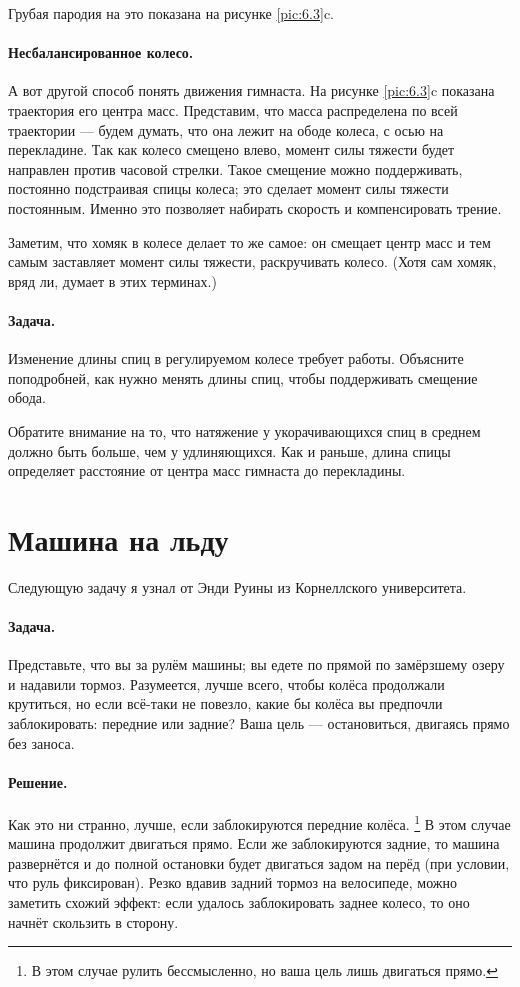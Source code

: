 Грубая пародия на это показана на рисунке \ref{pic:6.3}c.

\paragraph{Несбалансированное колесо.}
А вот другой способ понять движения гимнаста.
На рисунке \ref{pic:6.3}c показана траектория его центра масс.
Представим, что масса распределена по всей траектории --- будем думать, что она лежит на ободе колеса, с осью на перекладине.
Так как колесо смещено влево, момент силы тяжести будет направлен против часовой стрелки.
Такое смещение можно поддерживать, постоянно подстраивая спицы колеса;
это сделает момент силы тяжести постоянным.
Именно это позволяет набирать скорость и компенсировать трение.

Заметим, что хомяк в колесе делает то же самое:
он смещает центр масс и тем самым заставляет момент силы тяжести, раскручивать колесо.
(Хотя сам хомяк, вряд ли, думает в этих терминах.)

\paragraph{Задача.}
Изменение длины спиц в регулируемом колесе требует работы.
Объясните поподробней, как нужно менять длины спиц, чтобы поддерживать смещение обода.

Обратите внимание на то, что натяжение у укорачивающихся спиц в среднем должно быть больше, чем у удлиняющихся.
Как и раньше, длина спицы определяет расстояние от центра масс гимнаста до перекладины.

\section{Машина на льду}

Следующую задачу я узнал от Энди Руины %
из Корнеллского университета.

\paragraph{Задача.}
Представьте, что вы за рулём машины;
вы едете по прямой по замёрзшему озеру и надавили тормоз.
Разумеется, лучше всего, чтобы колёса продолжали крутиться,
но если всё-таки не повезло, какие бы колёса вы предпочли заблокировать: передние или задние?
Ваша цель — остановиться, двигаясь прямо без заноса.

\paragraph{Решение.}
Как это ни странно, лучше, если заблокируются передние колёса.%
\footnote{В этом случае рулить бессмысленно, но ваша цель лишь двигаться прямо.}
В этом случае машина продолжит двигаться прямо.
Если же заблокируются задние, то машина развернётся и до полной остановки будет  двигаться задом на перёд (при условии, что руль фиксирован).
Резко вдавив задний тормоз на велосипеде, можно заметить схожий эффект:
если удалось заблокировать заднее колесо, то оно начнёт скользить в сторону.

